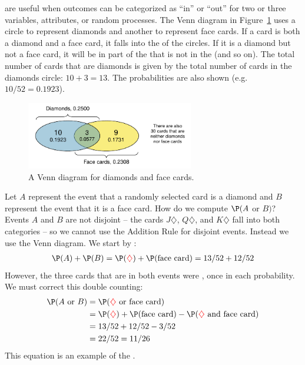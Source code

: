 \documentclass{ccg-topic}
\begin{document}
 are useful when outcomes can be categorized as ``in'' or ``out'' for two or three variables, attributes, or random processes. The Venn diagram in Figure~\ref{cardsDiamondFaceVenn} uses a circle to represent diamonds and another to represent face cards. If a card is both a diamond and a face card, it falls into the  of the circles. If it is a diamond but not a face card, it will be in part of the  that is not in the  (and so on). The total number of cards that are diamonds is given by the total number of cards in the diamonds circle: $10+3=13$. The probabilities are also shown (e.g. $10/52 = 0.1923$).

\begin{figure}[h]
\centering
\includegraphics[width=0.65\textwidth]{ch_probability/figures/cardsDiamondFaceVenn/cardsDiamondFaceVenn}
\caption{A Venn diagram for diamonds and face cards.}
\label{cardsDiamondFaceVenn}
\end{figure}

Let $A$ represent the event that a randomly selected card is a diamond and $B$ represent the event that it is a face card. How do we compute $\P(A$ or $B)$? Events $A$ and $B$ are not disjoint -- the cards {\color{red}$J\diamondsuit$}, {\color{red}$Q\diamondsuit$}, and {\color{red}$K\diamondsuit$} fall into both categories -- so we cannot use the Addition Rule for disjoint events. Instead we use the Venn diagram. We start by :
\begin{align*}
\P(A) + \P(B)
  = \P({\color{red}\diamondsuit}) + \P(\text{face card})
  = 13/52 + 12/52
\end{align*}
\noindent However, the three cards that are in both events were , once in each probability. We must correct this double counting:
\begin{align*}
\P(A\text{ or } B)
  &= \P({\color{red}\diamondsuit}\text{ or face card}) \\
  &= \P({\color{red}\diamondsuit}) + \P(\text{face card})
      - \P({\color{red}\diamondsuit}\text{ and face card}) \\
  &= 13/52 + 12/52 - 3/52 \\
  &= 22/52 = 11/26
\end{align*}
This equation is an example of the . 
\end{document}
